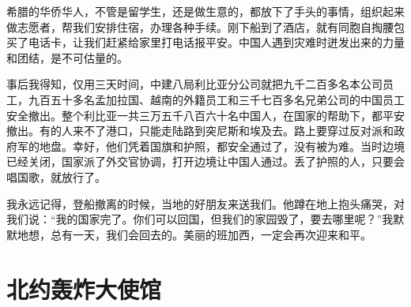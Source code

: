 \documentclass[12pt,UTF-8,openany]{ctexbook}
\begin{document}
\begin{large}
    希腊的华侨华人，不管是留学生，还是做生意的，都放下了手头的事情，组织起来做志愿者，帮我们安排住宿，办理各种手续。刚下船到了酒店，就有同胞自掏腰包买了电话卡，让我们赶紧给家里打电话报平安。中国人遇到灾难时迸发出来的力量和团结，是不可估量的。
    
    事后我得知，仅用三天时间，中建八局利比亚分公司就把九千二百多名本公司员工，九百五十多名孟加拉国、越南的外籍员工和三千七百多名兄弟公司的中国员工安全撤出。整个利比亚一共三万五千八百六十名中国人，在国家的帮助下，都平安撤出。有的人来不了港口，只能走陆路到突尼斯和埃及去。路上要穿过反对派和政府军的地盘。幸好，他们凭着国旗和护照，都安全通过了，没有被为难。当时边境已经关闭，国家派了外交官协调，打开边境让中国人通过。丢了护照的人，只要会唱国歌，就放行了。
    
    我永远记得，登船撤离的时候，当地的好朋友来送我们。他蹲在地上抱头痛哭，对我们说：“我的国家完了。你们可以回国，但我们的家园毁了，要去哪里呢？”我默默地想，总有一天，我们会回去的。美丽的班加西，一定会再次迎来和平。
    
\end{large}



\chapter{北约轰炸大使馆}
\end{document}

